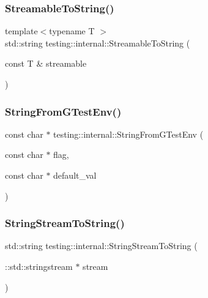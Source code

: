 \mbox{\label{namespacetesting_1_1internal_aad4beed95d0846e6ffc5da0978ef3bb9}} 
\subsubsection{\texorpdfstring{StreamableToString()}{StreamableToString()}}
{\footnotesize\ttfamily template$<$typename T $>$ \\
std\+::string testing\+::internal\+::\+Streamable\+To\+String (\begin{DoxyParamCaption}\item[{const T \&}]{streamable }\end{DoxyParamCaption})}

\mbox{\label{namespacetesting_1_1internal_a7ed785df46a339403b0f749d3a879201}} 
\subsubsection{\texorpdfstring{StringFromGTestEnv()}{StringFromGTestEnv()}}
{\footnotesize\ttfamily const char $\ast$ testing\+::internal\+::\+String\+From\+G\+Test\+Env (\begin{DoxyParamCaption}\item[{const char $\ast$}]{flag,  }\item[{const char $\ast$}]{default\+\_\+val }\end{DoxyParamCaption})}

\mbox{\label{namespacetesting_1_1internal_ac0a2b7f69fc829d80a39e925b6417e39}} 
\subsubsection{\texorpdfstring{StringStreamToString()}{StringStreamToString()}}
{\footnotesize\ttfamily std\+::string testing\+::internal\+::\+String\+Stream\+To\+String (\begin{DoxyParamCaption}\item[{\+::std\+::stringstream $\ast$}]{stream }\end{DoxyParamCaption})}

